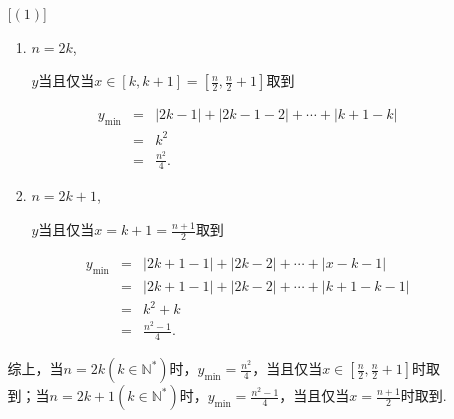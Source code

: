\documentclass[8pt]{article}
\begin{document}
\begin{enumerate}
\begin{enumerate} [$(1)$]
					\begin{enumerate} [$1^{\circ}$]
						\item
							$n=2k$,

							$y$当且仅当$x\in[k,k+1]=\left[\frac{n}{2},\frac{n}{2}+1\right]$取到

							$$
							\begin{array}{rcl}
								y_{\min}&=&|2k-1|+|2k-1-2|+\cdots+|k+1-k|\\
								&=&k^2\\
								&=&\frac{n^2}{4}.
							\end{array}
							$$

						\item
							$n=2k+1$,

							$y$当且仅当$x=k+1=\frac{n+1}{2}$取到

							$$
							\begin{array}{rcl}
								y_{\min}&=&|2k+1-1|+|2k-2|+\cdots+|x-k-1|\\
								&=&|2k+1-1|+|2k-2|+\cdots+|k+1-k-1|\\
								&=&k^2+k\\
								&=&\frac{n^2-1}{4}.
							\end{array}
							$$
					\end{enumerate}

					综上，当$n=2k \left(k\in\mathbb{N}^{*}\right)$时，$y_{\min}=\frac{n^2}{4}$，当且仅当$x\in\left[\frac{n}{2},\frac{n}{2}+1\right]$时取到；当$n=2k+1 \left(k\in\mathbb{N}^{*}\right)$时，$y_{\min}=\frac{n^2-1}{4}$，当且仅当$x=\frac{n+1}{2}$时取到.

			\end{enumerate}
			
	\end{enumerate}
\end{document}
